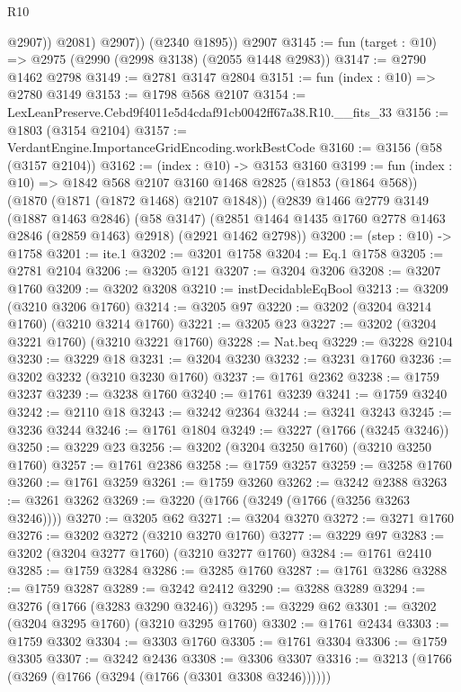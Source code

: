 \begin{lexlean}{R10}
\begin{coremodule}
                @2907))
            @2081)
          @2907))
      (@2340 @1895))
    @2907
@3145 := fun (target : @10) => @2975 (@2990 (@2998 @3138) (@2055 @1448 @2983))
@3147 := @2790 @1462 @2798
@3149 := @2781 @3147 @2804
@3151 := fun (index : @10) => @2780 @3149
@3153 := @1798 @568 @2107
@3154 := LexLeanPreserve.Cebd9f4011e5d4cdaf91cb0042ff67a38.R10.__fits_33
@3156 := @1803 (@3154 @2104)
@3157 := VerdantEngine.ImportanceGridEncoding.workBestCode
@3160 := @3156 (@58 (@3157 @2104))
@3162 := (index : @10) -> @3153 @3160
@3199 := fun (index : @10) =>
  @1842
    @568
    @2107
    @3160
    @1468
    @2825
    (@1853 (@1864 @568))
    (@1870 (@1871 (@1872 @1468) @2107 @1848))
    (@2839
      @1466
      @2779
      @3149
      (@1887 @1463 @2846)
      (@58 @3147)
      (@2851 @1464 @1435 @1760 @2778 @1463 @2846 (@2859 @1463) @2918)
      (@2921 @1462 @2798))
@3200 := (step : @10) -> @1758
@3201 := ite.{1}
@3202 := @3201 @1758
@3204 := Eq.{1} @1758
@3205 := @2781 @2104
@3206 := @3205 @121
@3207 := @3204 @3206
@3208 := @3207 @1760
@3209 := @3202 @3208
@3210 := instDecidableEqBool
@3213 := @3209 (@3210 @3206 @1760)
@3214 := @3205 @97
@3220 := @3202 (@3204 @3214 @1760) (@3210 @3214 @1760)
@3221 := @3205 @23
@3227 := @3202 (@3204 @3221 @1760) (@3210 @3221 @1760)
@3228 := Nat.beq
@3229 := @3228 @2104
@3230 := @3229 @18
@3231 := @3204 @3230
@3232 := @3231 @1760
@3236 := @3202 @3232 (@3210 @3230 @1760)
@3237 := @1761 @2362
@3238 := @1759 @3237
@3239 := @3238 @1760
@3240 := @1761 @3239
@3241 := @1759 @3240
@3242 := @2110 @18
@3243 := @3242 @2364
@3244 := @3241 @3243
@3245 := @3236 @3244
@3246 := @1761 @1804
@3249 := @3227 (@1766 (@3245 @3246))
@3250 := @3229 @23
@3256 := @3202 (@3204 @3250 @1760) (@3210 @3250 @1760)
@3257 := @1761 @2386
@3258 := @1759 @3257
@3259 := @3258 @1760
@3260 := @1761 @3259
@3261 := @1759 @3260
@3262 := @3242 @2388
@3263 := @3261 @3262
@3269 := @3220 (@1766 (@3249 (@1766 (@3256 @3263 @3246))))
@3270 := @3205 @62
@3271 := @3204 @3270
@3272 := @3271 @1760
@3276 := @3202 @3272 (@3210 @3270 @1760)
@3277 := @3229 @97
@3283 := @3202 (@3204 @3277 @1760) (@3210 @3277 @1760)
@3284 := @1761 @2410
@3285 := @1759 @3284
@3286 := @3285 @1760
@3287 := @1761 @3286
@3288 := @1759 @3287
@3289 := @3242 @2412
@3290 := @3288 @3289
@3294 := @3276 (@1766 (@3283 @3290 @3246))
@3295 := @3229 @62
@3301 := @3202 (@3204 @3295 @1760) (@3210 @3295 @1760)
@3302 := @1761 @2434
@3303 := @1759 @3302
@3304 := @3303 @1760
@3305 := @1761 @3304
@3306 := @1759 @3305
@3307 := @3242 @2436
@3308 := @3306 @3307
@3316 := @3213 (@1766 (@3269 (@1766 (@3294 (@1766 (@3301 @3308 @3246))))))

\end{coremodule}
\end{lexlean}
